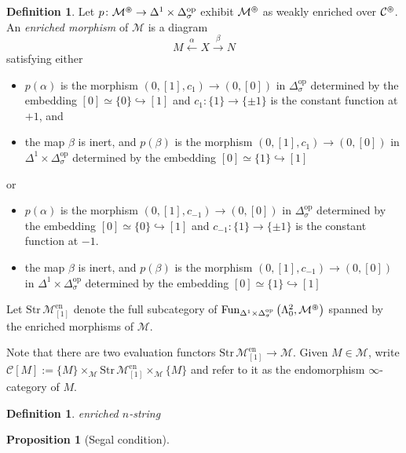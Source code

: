 \documentclass{article}
\DeclareMathOperator{\Fun}{Fun} %
\newcommand{\op}{\mathrm{op}}
\newtheorem{proposition}[equation]{Proposition}
\theoremstyle{definition}
\newtheorem{definition}[equation]{Definition}
\begin{document}
\begin{definition}
    Let $ p \colon \mathcal{M}^\varoast  \to \Delta^1\times \Delta^\op_\sigma $ exhibit $ \mathcal{M}^\varoast $ as weakly enriched over $ \mathcal{C}^\varoast $. 
    An \emph{enriched morphism} of $ \mathcal{M} $ is a diagram 
    \begin{equation*}
        M \xleftarrow{\alpha} X \xrightarrow{\beta} N
    \end{equation*}
    satisfying either 
    \begin{itemize}
        \item $ p (\alpha) $ is the morphism $ (0, [1], c_{1}) \to (0,[0]) $ in $ \Delta^\op_\sigma $ determined by the embedding $ [0] \simeq \{0\} \hookrightarrow [1] $ and $ c_1 \colon \{1\} \to \{\pm 1\} $ is the constant function at $ +1 $, and
        \item the map $ \beta $ is inert, and $ p(\beta) $ is the morphism $ (0,[1], c_{1}) \to (0, [0]) $ in $ \Delta^1 \times \Delta^\op_\sigma $ determined by the embedding $ [0]\simeq \{1\} \hookrightarrow [1] $
    \end{itemize}
    or
    \begin{itemize}
        \item $ p (\alpha) $ is the morphism $ (0, [1], c_{-1}) \to (0,[0]) $ in $ \Delta^\op_\sigma $ determined by the embedding $ [0] \simeq \{0\} \hookrightarrow [1] $ and $ c_{-1} \colon \{1\} \to \{\pm 1\} $ is the constant function at $ -1 $. 
        \item the map $ \beta $ is inert, and $ p(\beta) $ is the morphism $ (0,[1], c_{-1}) \to (0, [0]) $ in $ \Delta^1 \times \Delta^\op_\sigma $ determined by the embedding $ [0]\simeq \{1\} \hookrightarrow [1] $
    \end{itemize}
    Let $ \mathrm{Str}\, \mathcal{M}^{\mathrm{en}}_{[1]} $ denote the full subcategory of $ \Fun_{\Delta^1 \times \Delta^\op_\sigma }\left(\Lambda^2_0, \mathcal{M}^{\varoast} \right) $ spanned by the enriched morphisms of $ \mathcal{M} $. 

    Note that there are two evaluation functors $ \mathrm{Str}\, \mathcal{M}^{\mathrm{en}}_{[1]} \to \mathcal{M} $. 
    Given $ M \in \mathcal{M} $, write $ \mathcal{C}[M] := \{M\} \times_{\mathcal{M}} \mathrm{Str}\, \mathcal{M}^{\mathrm{en}}_{[1]} \times_{\mathcal{M}} \{M\} $ and refer to it as the endomorphism $ \infty $-category of $ M $. 
\end{definition} 
\begin{definition}
    \emph{enriched $ n $-string} 
\end{definition}
\begin{proposition}
    [Segal condition] 
\end{proposition}
\end{document}
